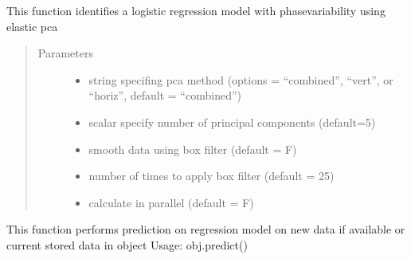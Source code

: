 \documentclass[letterpaper,10pt,english]{sphinxmanual}
\begin{document}
\begin{fulllineitems}
\begin{fulllineitems}
\label{\detokenize{pcr_regression:pcr_regression.elastic_lpcr_regression.calc_model}}
This function identifies a logistic regression model with phase\sphinxhyphen{}variability
using elastic pca
\begin{quote}\begin{description}
\item[{Parameters}] \leavevmode\begin{itemize}
\item {} 
 \textendash{} string specifing pca method (options = “combined”,
“vert”, or “horiz”, default = “combined”)

\item {} 
 \textendash{} scalar specify number of principal components (default=5)

\item {} 
 \textendash{} smooth data using box filter (default = F)

\item {} 
 \textendash{} number of times to apply box filter (default = 25)

\item {} 
 \textendash{} calculate in parallel (default = F)

\end{itemize}

\end{description}\end{quote}

\end{fulllineitems}


\begin{fulllineitems}
\label{\detokenize{pcr_regression:pcr_regression.elastic_lpcr_regression.predict}}
This function performs prediction on regression model on new data if available or current stored data in object
Usage:  obj.predict()
\begin{quote}


\end{quote}
\end{fulllineitems}
\end{fulllineitems}
\end{document}
